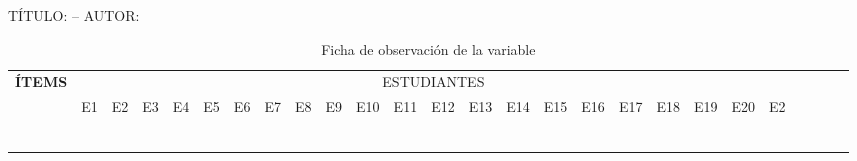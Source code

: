\documentclass[12pt,a4paper]{article}
\newcommand{\ce}{\centering}
\newcommand\Tstrut{\rule{0pt}{2.35ex}}
\begin{document}
\begin{landscape}

	TÍTULO: \titulo -- AUTOR: \autor
	\begin{table}[ht!]\caption{Ficha de observación de la variable \MakeTextLowercase{\variabled}}
		\centering \scriptsize\renewcommand\tabcolsep{0.1cm}\renewcommand{}
		\begin{tabular}{|l|l|l|l|l|l|l|l|l|l|l|l|l|l|l|l|l|l|l|l|l|l|l|l|l|l|}
			\hline
			\multirow{2}{*}{ \ce\bf ÍTEMS} & \multicolumn{21}{c|}{ESTUDIANTES}\Tstrut                                                                                                                       \\\cline{2-22}
			                               & E1                                       & E2 & E3 & E4 & E5 & E6 & E7 & E8 & E9 & E10 & E11 & E12 & E13 & E14 & E15 & E16 & E17 & E18 & E19 & E20 & E2\Tstrut \\\hline
			                               &                                          &    &    &    &    &    &    &    &    &     &     &     &     &     &     &     &     &     &     &     &           \\\hline
			                               &                                          &    &    &    &    &    &    &    &    &     &     &     &     &     &     &     &     &     &     &     &           \\\hline
			                               &                                          &    &    &    &    &    &    &    &    &     &     &     &     &     &     &     &     &     &     &     &           \\\hline
			                               &                                          &    &    &    &    &    &    &    &    &     &     &     &     &     &     &     &     &     &     &     &           \\\hline
			                               &                                          &    &    &    &    &    &    &    &    &     &     &     &     &     &     &     &     &     &     &     &           \\\hline
			                               &                                          &    &    &    &    &    &    &    &    &     &     &     &     &     &     &     &     &     &     &     &           \\\hline

\end{tabular}
\end{table}
\end{landscape}
\end{document}
